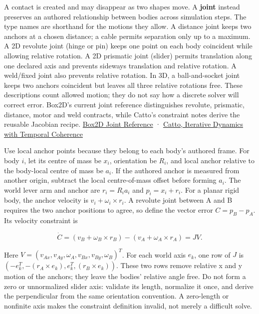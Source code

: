 \hypertarget{06-engine-ii-ch033-a-joint-removes-selected-relative-motion-not-every-motion}{}

A contact is created and may disappear as two shapes move. A \textbf{joint} instead preserves an authored relationship between bodies across simulation steps. The type names are shorthand for the motions they allow. A distance joint keeps two anchors at a chosen distance; a cable permits separation only up to a maximum. A 2D revolute joint (hinge or pin) keeps one point on each body coincident while allowing relative rotation. A 2D prismatic joint (slider) permits translation along one declared axis and prevents sideways translation and relative rotation. A weld/fixed joint also prevents relative rotation. In 3D, a ball-and-socket joint keeps two anchors coincident but leaves all three relative rotations free. These descriptions count allowed motion; they do not say how a discrete solver will correct error. Box2D's current joint reference distinguishes revolute, prismatic, distance, motor and weld contracts, while Catto's constraint notes derive the reusable Jacobian recipe. \href{https://box2d.org/documentation/group__joint.html}{Box2D Joint Reference} · \href{https://box2d.org/files/ErinCatto_IterativeDynamicsSlides_GDC2005.pdf}{Catto, Iterative Dynamics with Temporal Coherence}

Use local anchor points because they belong to each body's authored frame. For body \(i\), let its centre of mass be \(x_i\), orientation be \(R_i\), and local anchor relative to the body-local centre of mass be \(a_i\). If the authored anchor is measured from another origin, subtract the local centre-of-mass offset before forming \(a_i\). The world lever arm and anchor are \(r_i=R_i a_i\) and \(p_i=x_i+r_i\). For a planar rigid body, the anchor velocity is \(v_i+\omega_i\times r_i\). A revolute joint between A and B requires the two anchor positions to agree, so define the vector error \(C=p_B-p_A\). Its velocity constraint is

\[
\dot C=(v_B+\omega_B\times r_B)-(v_A+\omega_A\times r_A)=JV.
\]

Here \(V=(v_{Ax},v_{Ay},\omega_A,v_{Bx},v_{By},\omega_B)^T\). For each world axis \(e_k\), one row of \(J\) is \((-e_k^T,-(r_A\times e_k),e_k^T,(r_B\times e_k))\). These two rows remove relative x and y motion of the anchors; they leave the bodies' relative angle free. Do not form a zero or unnormalized slider axis: validate its length, normalize it once, and derive the perpendicular from the same orientation convention. A zero-length or nonfinite axis makes the constraint definition invalid, not merely a difficult solve.

